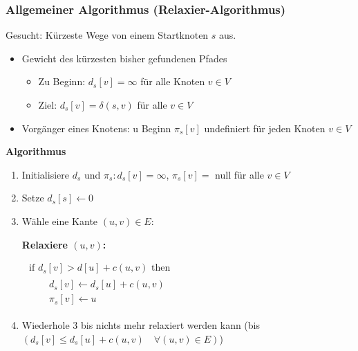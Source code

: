\begin{sectionbox}
\subsubsection{Allgemeiner Algorithmus (Relaxier-Algorithmus)}\smallskip
Gesucht: Kürzeste Wege von einem Startknoten $s$ aus.
\begin{itemize}
    \item Gewicht des kürzesten bisher gefundenen Pfades
    \begin{itemize}
        \item Zu Beginn: $d_{s}[v]=\infty$ für alle Knoten $v \in V$
        \item Ziel: $d_{s}[v]=\delta(s, v)$ für alle $v \in V$
    \end{itemize}
    \item Vorgänger eines Knotens: u Beginn $\pi_{s}[v]$ undefiniert für jeden Knoten $v \in V$
\end{itemize}\smallskip


\textbf{Algorithmus}\smallskip
\begin{enumerate}
    \item Initialisiere $d_{s}$ und $\pi_{s}: d_{s}[v]=\infty$, $\pi_{s}[v]=$ null für alle $v \in V$
    \item Setze $d_{s}[s] \leftarrow 0$
    \item Wähle eine Kante $(u, v) \in E$:\par
    \begin{greenbox}
    \textbf{Relaxiere $(u, v)$:}\par
    $\begin{array}{l}
    \text { if } d_{s}[v]>d[u]+c(u, v) \text { then } \\
    \qquad \begin{array}{l}
    d_{s}[v] \leftarrow d_{s}[u]+c(u, v) \\
    \pi_{s}[v] \leftarrow u
    \end{array}
    \end{array}$
    \end{greenbox}
    \item Wiederhole 3 bis nichts mehr relaxiert werden kann (bis $\left(d_{s}[v] \leq d_{s}[u]+c(u, v) \quad \forall(u, v) \in E\right)$)
\end{enumerate}
\end{sectionbox}
\vspace{-4pt}
